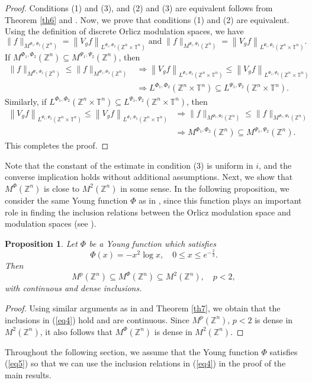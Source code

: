 \documentclass[a4paper,11pt, reqno]{amsart}
\theoremstyle{plain}
\newtheorem{proposition}[theorem]{Proposition}
\theoremstyle{definition}
\theoremstyle{remark}
\def \Z{{\mathbb Z}}
\def \T{{\mathbb T}}
\begin{document}
\begin{proof}
Conditions (1) and (3), and (2) and (3) are equivalent follows from Theorem \ref{th6} and \cite[Proposition 5.11]{tof22}. Now, we prove that conditions (1) and (2) are equivalent. Using the definition of discrete Orlicz modulation spaces, we have
\[ \|f\|_{M^{\Phi_1, \Phi_2}(\Z^n)} = \left\|V_g f\right\|_{L^{\Phi_1, \Phi_2}(\Z^n \times \T^n)} \; \text{and}  \; \|f\|_{M^{\Psi_1, \Psi_2}(\Z^n)} = \left\|V_g f\right\|_{L^{\Psi_1, \Psi_2}(\Z^n \times \T^n)}. \]
If $M^{\Phi_1, \Phi_2}(\Z^n) \subseteq M^{\Psi_1, \Psi_2}(\Z^n)$, then
\begin{align*}
\|f\|_{M^{\Psi_1, \Psi_2}(\Z^n)} \leq \|f\|_{M^{\Phi_1, \Phi_2}(\Z^n)}
& \Rightarrow  \left\|V_g f\right\|_{L^{\Psi_1, \Psi_2}(\Z^n \times \T^n)} \leq \left\|V_g f\right\|_{L^{\Phi_1, \Phi_2}(\Z^n \times \T^n)}  \\
& \Rightarrow  L^{\Phi_1, \Phi_2} (\Z^n \times \T^n) \subseteq  L^{\Psi_1, \Psi_2} (\Z^n \times \T^n) .
\end{align*}
Similarly, if $ L^{\Phi_1, \Phi_2} (\Z^n \times \T^n) \subseteq  L^{\Psi_1, \Psi_2} (\Z^n \times \T^n) $, then 
\begin{align*}
\left\|V_g f\right\|_{L^{\Psi_1, \Psi_2}(\Z^n \times \T^n)} \leq \left\|V_g f\right\|_{L^{\Phi_1, \Phi_2}(\Z^n \times \T^n)}  
& \Rightarrow \|f\|_{M^{\Psi_1, \Psi_2}(\Z^n)} \leq \|f\|_{M^{\Phi_1, \Phi_2}(\Z^n)} \\
& \Rightarrow  M^{\Phi_1, \Phi_2}(\Z^n) \subseteq M^{\Psi_1, \Psi_2}(\Z^n).
\end{align*}
This completes the proof.
\end{proof}
Note that the constant of the estimate in condition (3) is uniform in $i$, and the converse implication holds without additional assumptions. Next, we show that $M^{\Phi}(\Z^n)$ is close to $M^{2}(\Z^n)$ in some sense. In the following proposition, we consider the same Young function $\Phi$ as in \cite{gum24}, since this function plays an important role in finding the inclusion relations between the Orlicz modulation space and modulation spaces (see \cite{gum24}).
\begin{proposition}\label{pro7}
Let $\Phi$ be a Young function which satisfies 
\begin{equation}\label{eq5}
\Phi(x)= - x^2 \log x, \quad  0 \leq x \leq e^{-\frac{2}{3}} .
\end{equation} 
Then 
\begin{equation}\label{eq4}
M^{p}(\Z^n) \subseteq M^{\Phi}(\Z^n)  \subseteq M^{2}(\Z^n),  \quad p<2,
\end{equation}
with continuous and dense inclusions.
\end{proposition}
\begin{proof}
Using similar arguments as in \cite[Lemma 3.2]{gum24} and Theorem \ref{th7}, we obtain that the inclusions in (\ref{eq4}) hold and are continuous. Since $M^{p}(\Z^n)$, $ p < 2$ is dense in $M^{2}(\Z^n)$, it also follows that $M^{\Phi}(\Z^n)$ is dense in $M^{2}(\Z^n)$.
\end{proof} 
Throughout the following section, we assume that the Young function $\Phi$ satisfies (\ref{eq5}) so that we can use the inclusion relations in (\ref{eq4}) in the proof of the main results.
\end{document}
